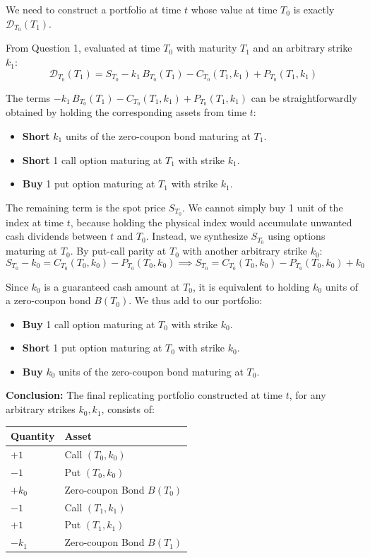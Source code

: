 \documentclass[12pt,a4paper]{article}
\begin{document}
We need to construct a portfolio at time $t$ whose value at time $T_0$ is exactly $\mathcal{D}_{T_0}(T_1)$.

From Question 1, evaluated at time $T_0$ with maturity $T_1$ and an arbitrary strike $k_1$:
\begin{equation}
\mathcal{D}_{T_0}(T_1) = S_{T_0} - k_1\,B_{T_0}(T_1) - C_{T_0}(T_1,k_1) + P_{T_0}(T_1,k_1) \label{eq:Q3-target}
\end{equation}

The terms $-k_1\,B_{T_0}(T_1) - C_{T_0}(T_1,k_1) + P_{T_0}(T_1,k_1)$ can be straightforwardly obtained by holding the corresponding assets from time $t$:
\begin{itemize}
    \item \textbf{Short} $k_1$ units of the zero-coupon bond maturing at $T_1$.
    \item \textbf{Short} 1 call option maturing at $T_1$ with strike $k_1$.
    \item \textbf{Buy} 1 put option maturing at $T_1$ with strike $k_1$.
\end{itemize}

The remaining term is the spot price $S_{T_0}$. We cannot simply buy 1 unit of the index at time $t$, because holding the physical index would accumulate unwanted cash dividends between $t$ and $T_0$. Instead, we synthesize $S_{T_0}$ using options maturing at $T_0$. By put-call parity at $T_0$ with another arbitrary strike $k_0$:
\begin{equation*}
S_{T_0} - k_0 = C_{T_0}(T_0,k_0) - P_{T_0}(T_0,k_0) \implies S_{T_0} = C_{T_0}(T_0,k_0) - P_{T_0}(T_0,k_0) + k_0
\end{equation*}

Since $k_0$ is a guaranteed cash amount at $T_0$, it is equivalent to holding $k_0$ units of a zero-coupon bond $B(T_0)$. We thus add to our portfolio:
\begin{itemize}
    \item \textbf{Buy} 1 call option maturing at $T_0$ with strike $k_0$.
    \item \textbf{Short} 1 put option maturing at $T_0$ with strike $k_0$.
    \item \textbf{Buy} $k_0$ units of the zero-coupon bond maturing at $T_0$.
\end{itemize}

\textbf{Conclusion:} The final replicating portfolio constructed at time $t$, for any arbitrary strikes $k_0, k_1$, consists of:
\begin{table}[h]
\centering
\begin{tabular}{ll}
\textbf{Quantity} & \textbf{Asset} \\
\hline
$+1$ & Call $(T_0, k_0)$ \\
$-1$ & Put $(T_0, k_0)$ \\
$+k_0$ & Zero-coupon Bond $B(T_0)$ \\
$-1$ & Call $(T_1, k_1)$ \\
$+1$ & Put $(T_1, k_1)$ \\
$-k_1$ & Zero-coupon Bond $B(T_1)$ \\
\hline
\end{tabular}
\end{table}
\end{document}

